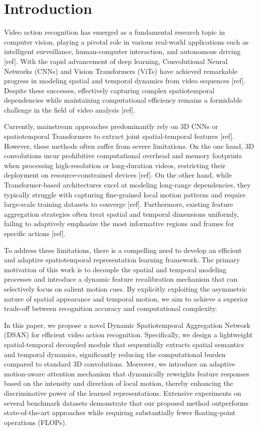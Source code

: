 \documentclass[lettersize,journal]{IEEEtran}
\begin{document}
\section{Introduction}

Video action recognition has emerged as a fundamental research topic in computer vision, playing a pivotal role in various real-world applications such as intelligent surveillance, human-computer interaction, and autonomous driving [ref]. With the rapid advancement of deep learning, Convolutional Neural Networks (CNNs) and Vision Transformers (ViTs) have achieved remarkable progress in modeling spatial and temporal dynamics from video sequences [ref]. Despite these successes, effectively capturing complex spatiotemporal dependencies while maintaining computational efficiency remains a formidable challenge in the field of video analysis [ref].

Currently, mainstream approaches predominantly rely on 3D CNNs or spatiotemporal Transformers to extract joint spatial-temporal features [ref]. However, these methods often suffer from severe limitations. On the one hand, 3D convolutions incur prohibitive computational overhead and memory footprints when processing high-resolution or long-duration videos, restricting their deployment on resource-constrained devices [ref]. On the other hand, while Transformer-based architectures excel at modeling long-range dependencies, they typically struggle with capturing fine-grained local motion patterns and require large-scale training datasets to converge [ref]. Furthermore, existing feature aggregation strategies often treat spatial and temporal dimensions uniformly, failing to adaptively emphasize the most informative regions and frames for specific actions [ref].

To address these limitations, there is a compelling need to develop an efficient and adaptive spatiotemporal representation learning framework. The primary motivation of this work is to decouple the spatial and temporal modeling processes and introduce a dynamic feature recalibration mechanism that can selectively focus on salient motion cues. By explicitly exploiting the asymmetric nature of spatial appearance and temporal motion, we aim to achieve a superior trade-off between recognition accuracy and computational complexity.

In this paper, we propose a novel Dynamic Spatiotemporal Aggregation Network (DSAN) for efficient video action recognition. Specifically, we design a lightweight spatial-temporal decoupled module that sequentially extracts spatial semantics and temporal dynamics, significantly reducing the computational burden compared to standard 3D convolutions. Moreover, we introduce an adaptive motion-aware attention mechanism that dynamically reweights feature responses based on the intensity and direction of local motion, thereby enhancing the discriminative power of the learned representations. Extensive experiments on several benchmark datasets demonstrate that our proposed method outperforms state-of-the-art approaches while requiring substantially fewer floating-point operations (FLOPs).
\end{document}
